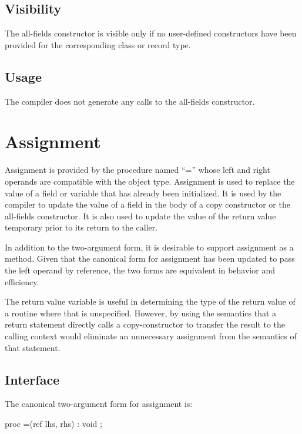 \subsection{Visibility}

The all-fields constructor is visible only if no user-defined constructors have
been provided for the corresponding class or record type.

\subsection{Usage}

The compiler does not generate any calls to the all-fields constructor.

\section{Assignment}

Assignment is provided by the procedure named ``='' whose left and right
operands are compatible with the object type.  Assignment is used to replace the
value of a field or variable that has already been initialized.  It is used by
the compiler to update the value of a field in the body of a copy constructor or
the all-fields constructor.  It is also used to update the value of the return
value temporary prior to its return to the caller.

\begin{future}

In addition to the two-argument form, it is desirable to support assignment as a
method.  Given that the canonical form for assignment has been updated to pass
the left operand by reference, the two forms are equivalent in behavior and
efficiency.

The return value variable is useful in determining the type of the return value
of a routine where that is unspecified.  However, by using the semantics that a
return statement directly calls a copy-constructor to transfer the result to the
calling context would eliminate an unnecessary assignment from the semantics of
that statement.

\end{future}

\subsection{Interface}

The canonical two-argument form for assignment is:
\begin{chapel}
proc =(ref lhs, rhs) : void ;
\end{chapel}

